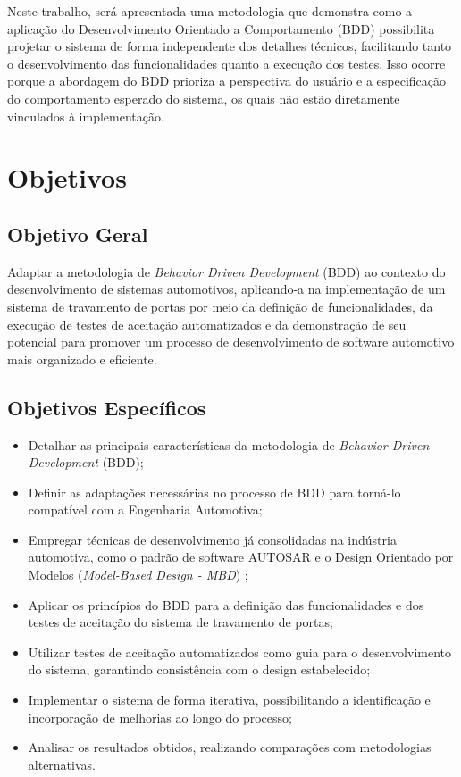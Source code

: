 Neste trabalho, será apresentada uma metodologia que demonstra como a aplicação do Desenvolvimento Orientado a Comportamento (BDD) possibilita projetar o 
sistema de forma independente dos detalhes técnicos, facilitando tanto o desenvolvimento das funcionalidades quanto a execução dos testes. Isso ocorre 
porque a abordagem do BDD prioriza a perspectiva do usuário e a especificação do comportamento esperado do sistema, os quais não estão diretamente vinculados 
à implementação.

\section{\textbf{Objetivos}}

\subsection{Objetivo Geral}
Adaptar a metodologia de \textit{Behavior Driven Development} (BDD) ao contexto do desenvolvimento de sistemas automotivos, aplicando-a na implementação de um sistema 
de travamento de portas por meio da definição de funcionalidades, da execução de testes de aceitação automatizados e da demonstração de seu potencial para promover um 
processo de desenvolvimento de software automotivo mais organizado e eficiente.

\subsection{Objetivos Específicos}
\begin{itemize}
    \item Detalhar as principais características da metodologia de \textit{Behavior Driven Development} (BDD);
    \item Definir as adaptações necessárias no processo de BDD para torná-lo compatível com a Engenharia Automotiva;
    \item Empregar técnicas de desenvolvimento já consolidadas na indústria automotiva, como o padrão de software AUTOSAR \cite{autosarClassic} e o Design Orientado por Modelos (\textit{Model-Based Design - MBD}) \cite{mathworksMBD2024};
    \item Aplicar os princípios do BDD para a definição das funcionalidades e dos testes de aceitação do sistema de travamento de portas;
    \item Utilizar testes de aceitação automatizados como guia para o desenvolvimento do sistema, garantindo consistência com o design estabelecido;
    \item Implementar o sistema de forma iterativa, possibilitando a identificação e incorporação de melhorias ao longo do processo;
    \item Analisar os resultados obtidos, realizando comparações com metodologias alternativas.
\end{itemize}

